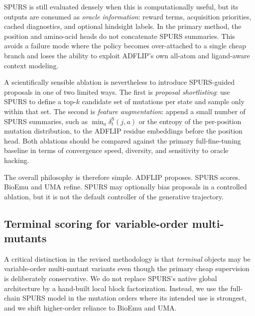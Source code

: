 \documentclass[11pt]{article}
\begin{document}
SPURS is still evaluated densely when this is computationally useful, but its outputs are consumed as \emph{oracle information}: reward terms, acquisition priorities, cached diagnostics, and optional hindsight labels. In the primary method, the position and amino-acid heads do not concatenate SPURS summaries. This avoids a failure mode where the policy becomes over-attached to a single cheap branch and loses the ability to exploit ADFLIP's own all-atom and ligand-aware context modeling.

A scientifically sensible ablation is nevertheless to introduce SPURS-guided proposals in one of two limited ways. The first is \emph{proposal shortlisting}: use SPURS to define a top-$k$ candidate set of mutations per state and sample only within that set. The second is \emph{feature augmentation}: append a small number of SPURS summaries, such as $\min_a \delta_t^{\mathrm S}(j,a)$ or the entropy of the per-position mutation distribution, to the ADFLIP residue embeddings before the position head. Both ablations should be compared against the primary full-fine-tuning baseline in terms of convergence speed, diversity, and sensitivity to oracle hacking.

The overall philosophy is therefore simple. ADFLIP proposes. SPURS scores. BioEmu and UMA refine. SPURS may optionally bias proposals in a controlled ablation, but it is not the default controller of the generative trajectory.



\subsection{Terminal scoring for variable-order multi-mutants}

A critical distinction in the revised methodology is that \emph{terminal} objects may be variable-order multi-mutant variants even though the primary cheap supervision is deliberately conservative. We do not replace SPURS's native global architecture by a hand-built local block factorization. Instead, we use the full-chain SPURS model in the mutation orders where its intended use is strongest, and we shift higher-order reliance to BioEmu and UMA.
\end{document}
